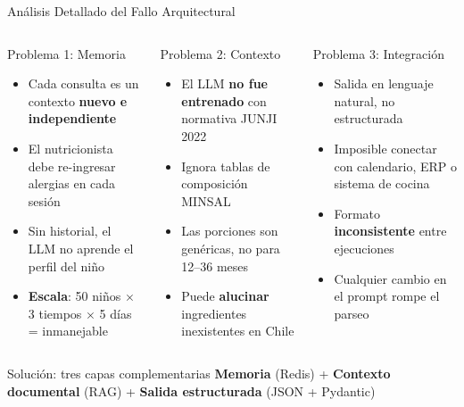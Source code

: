 \documentclass[aspectratio=169]{beamer}
\begin{document}
\begin{frame}{Análisis Detallado del Fallo Arquitectural}
  \begin{columns}
    \begin{alertblock}{\centering Problema 1: Memoria}
      \begin{itemize}
        \item Cada consulta es un contexto \textbf{nuevo e independiente}
        \item El nutricionista debe re-ingresar alergias en cada sesión
        \item Sin historial, el LLM no aprende el perfil del niño
        \item \textbf{Escala}: 50 niños $\times$ 3 tiempos $\times$ 5 días = inmanejable
      \end{itemize}
    \end{alertblock}
    \begin{alertblock}{\centering Problema 2: Contexto}
      \begin{itemize}
        \item El LLM \textbf{no fue entrenado} con normativa JUNJI 2022
        \item Ignora tablas de composición MINSAL
        \item Las porciones son genéricas, no para 12--36 meses
        \item Puede \textbf{alucinar} ingredientes inexistentes en Chile
      \end{itemize}
    \end{alertblock}
    \begin{alertblock}{\centering Problema 3: Integración}
      \begin{itemize}
        \item Salida en lenguaje natural, no estructurada
        \item Imposible conectar con calendario, ERP o sistema de cocina
        \item Formato \textbf{inconsistente} entre ejecuciones
        \item Cualquier cambio en el prompt rompe el parseo
      \end{itemize}
    \end{alertblock}
  \end{columns}
  \vspace{0.5em}
  \begin{exampleblock}{Solución: tres capas complementarias}
    \centering
    \textbf{Memoria} (Redis) \quad + \quad \textbf{Contexto documental} (RAG) \quad + \quad \textbf{Salida estructurada} (JSON + Pydantic)
  \end{exampleblock}
\end{frame}
\end{document}
